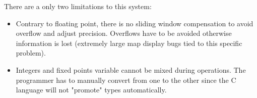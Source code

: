 There are a only two limitations to this system:
\begin{itemize}
  \item Contrary to floating point, there is no sliding window compensation to avoid overflow and adjust precision. Overflows have to be avoided otherwise information is lost (extremely large map display bugs tied to this specific problem). 
  \item Integers and fixed points variable cannot be mixed during operations. The programmer has to manually convert from one to the other since the C language will not "promote" types automatically.
\end{itemize}
 


\pagebreak

